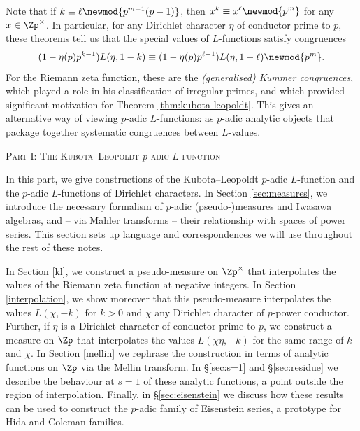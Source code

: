 \documentclass[a4paper,10pt, english, reqno]{smfart}
\numberwithin{equation}{section}
\begin{document}
\begin{remark}\label{rem:kummer congruences}
Note that if $k \equiv \ell \newmod{p^{m-1}(p-1)}$, then $x^k \equiv x^\ell \newmod{p^m}$ for any $x \in \Zp^\times$. In particular,  for any Dirichlet character $\eta$ of conductor prime to $p$, these theorems tell us that the special values of $L$-functions satisfy congruences
\[
    (1-\eta(p)p^{k-1})L(\eta, 1-k) \equiv (1-\eta(p)p^{\ell-1})L(\eta,1-\ell) \newmod{p^m}.
\]
For the Riemann zeta function, these are the \emph{(generalised) Kummer congruences}, which played a role in his classification of irregular primes, and which provided significant motivation for Theorem \ref{thm:kubota-leopoldt}. This gives an alternative way of viewing $p$-adic $L$-functions: as $p$-adic analytic objects that package together systematic congruences between $L$-values.
\end{remark}










\newpage
\begin{center}
	\scshape{{\LARGE Part I: The Kubota--Leopoldt $p$-adic $L$-function}}\\[20pt]
\end{center}

In this part, we give constructions of the Kubota--Leopoldt $p$-adic $L$-function and the $p$-adic $L$-functions of Dirichlet characters. In Section \ref{sec:measures}, we introduce the necessary formalism of $p$-adic (pseudo-)measures and Iwasawa algebras, and -- via Mahler transforms -- their relationship with spaces of power series. This section sets up language and correspondences we will use throughout the rest of these notes. 

In Section \ref{kl}, we construct a pseudo-measure on $\Zp^\times$ that interpolates the values of the Riemann zeta function at negative integers. In Section \ref{interpolation}, we show moreover that this pseudo-measure interpolates the values $L(\chi,-k)$ for $k > 0$ and $\chi$ any Dirichlet character of $p$-power conductor. Further, if $\eta$ is a Dirichlet character of conductor prime to $p$, we construct a measure on $\Zp$ that interpolates the values $L(\chi\eta,-k)$ for the same range of $k$ and $\chi$. In Section \ref{mellin} we rephrase the construction in terms of analytic functions on $\Zp$ via the Mellin transform. In \S\ref{sec:s=1} and \S\ref{sec:residue} we describe the behaviour at $s=1$ of these analytic functions, a point outside the region of interpolation. Finally, in \S\ref{sec:eisenstein} we discuss how these results can be used to construct the $p$-adic family of Eisenstein series, a prototype for Hida and Coleman families.
\end{document}
